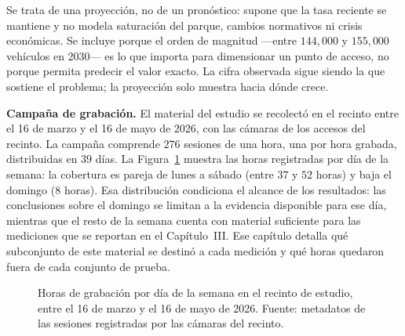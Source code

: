 Se trata de una proyección, no de un pronóstico: supone que la tasa reciente se
mantiene y no modela saturación del parque, cambios normativos ni crisis
económicas. Se incluye porque el orden de magnitud ---entre $144{,}000$ y $155{,}000$
vehículos en 2030--- es lo que importa para dimensionar un punto de acceso, no
porque permita predecir el valor exacto. La cifra observada sigue siendo la que
sostiene el problema; la proyección solo muestra hacia dónde crece.

\textbf{Campaña de grabación.} El material del estudio se recolectó en el recinto
entre el 16 de marzo y el 16 de mayo de 2026, con las cámaras de los accesos del
recinto.
La campaña comprende $276$ sesiones de una hora, una por hora grabada, distribuidas
en $39$ días. La Figura~\ref{fig:cobertura_grabacion} muestra las horas registradas
por día de la semana: la cobertura es pareja de lunes a sábado (entre $37$ y $52$
horas) y baja el domingo ($8$ horas). Esa distribución condiciona el alcance de los
resultados: las conclusiones sobre el domingo se limitan a la evidencia disponible
para ese día, mientras que el resto de la semana cuenta con material suficiente
para las mediciones que se reportan en el Capítulo~III. Ese capítulo detalla qué
subconjunto de este material se destinó a cada medición y qué horas quedaron fuera
de cada conjunto de prueba.

\begin{figure}[htbp]
    \centering
    \caption{Horas de grabación por día de la semana en el recinto de estudio,
    entre el 16 de marzo y el 16 de mayo de 2026. Fuente: metadatos de las
    sesiones registradas por las cámaras del recinto.}
    \label{fig:cobertura_grabacion}
\end{figure}

